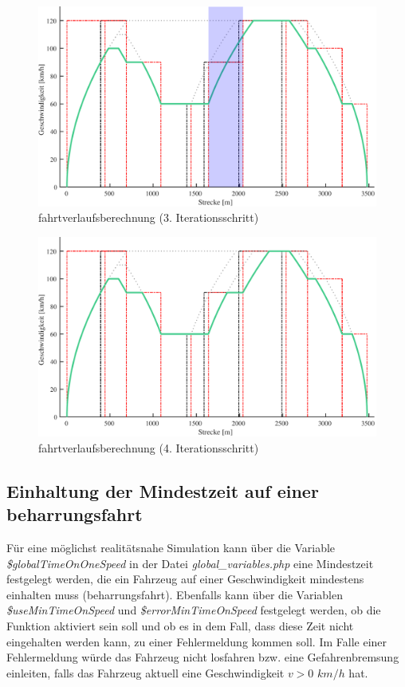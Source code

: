 \begin{figure}
\includegraphics[width=\linewidth]{../images/matlab/it5.pdf}
\caption{\Gls{fahrtverlauf}sberechnung (3. Iterationsschritt)}
\label{fig:it5}
\end{figure}
\begin{figure}
\includegraphics[width=\linewidth]{../images/matlab/it6.pdf}
\caption{\Gls{fahrtverlauf}sberechnung (4. Iterationsschritt)}
\label{fig:it6}
\end{figure}
\subsection{Einhaltung der Mindestzeit auf einer \Gls{beharrungsfahrt}} \label{minTime}
Für eine möglichst realitätsnahe Simulation kann über die Variable \textit{\$global\-Time\-On\-One\-Speed} in der Datei \textit{global\_variables.php} eine Mindestzeit festgelegt werden, die ein Fahrzeug auf einer Geschwindigkeit mindestens einhalten muss (\Gls{beharrungsfahrt}). Ebenfalls kann über die Variablen \textit{\$useMinTimeOnSpeed} und \textit{\$errorMinTimeOnSpeed} festgelegt werden, ob die Funktion aktiviert sein soll und ob es in dem Fall, dass diese Zeit nicht eingehalten werden kann, zu einer Fehlermeldung kommen soll. Im Falle einer Fehlermeldung würde das Fahrzeug nicht losfahren bzw. eine Gefahrenbremsung einleiten, falls das Fahrzeug aktuell eine Geschwindigkeit $v > 0$ $km/h$ hat. 

